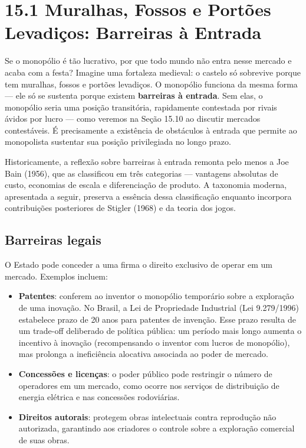 \documentclass[11pt,twoside,openright]{book}
\providecommand{\tightlist}{\setlength{\itemsep}{0pt}\setlength{\parskip}{0pt}}
\begin{document}
\section{15.1 Muralhas, Fossos e Portões Levadiços: Barreiras à
Entrada}\label{151}

Se o monopólio é tão lucrativo, por que todo mundo não entra nesse
mercado e acaba com a festa? Imagine uma fortaleza medieval: o castelo
só sobrevive porque tem muralhas, fossos e portões levadiços. O
monopólio funciona da mesma forma --- ele só se sustenta porque existem
\textbf{barreiras à entrada}. Sem elas, o monopólio seria uma posição
transitória, rapidamente contestada por rivais ávidos por lucro --- como
veremos na Seção 15.10 ao discutir mercados contestáveis. É precisamente
a existência de obstáculos à entrada que permite ao monopolista
sustentar sua posição privilegiada no longo prazo.

Historicamente, a reflexão sobre barreiras à entrada remonta pelo menos
a Joe Bain (1956), que as classificou em três categorias --- vantagens
absolutas de custo, economias de escala e diferenciação de produto. A
taxonomia moderna, apresentada a seguir, preserva a essência dessa
classificação enquanto incorpora contribuições posteriores de Stigler
(1968) e da teoria dos jogos.

\subsection{Barreiras legais}\label{barreiras-legais}

O Estado pode conceder a uma firma o direito exclusivo de operar em um
mercado. Exemplos incluem:

\begin{itemize}
\tightlist
\item
  \textbf{Patentes}: conferem ao inventor o monopólio temporário sobre a
  exploração de uma inovação. No Brasil, a Lei de Propriedade Industrial
  (Lei 9.279/1996) estabelece prazo de 20 anos para patentes de
  invenção. Esse prazo resulta de um trade-off deliberado de política
  pública: um período mais longo aumenta o incentivo à inovação
  (recompensando o inventor com lucros de monopólio), mas prolonga a
  ineficiência alocativa associada ao poder de mercado.
\item
  \textbf{Concessões e licenças}: o poder público pode restringir o
  número de operadores em um mercado, como ocorre nos serviços de
  distribuição de energia elétrica e nas concessões rodoviárias.
\item
  \textbf{Direitos autorais}: protegem obras intelectuais contra
  reprodução não autorizada, garantindo aos criadores o controle sobre a
  exploração comercial de suas obras.
\end{itemize}
\end{document}
